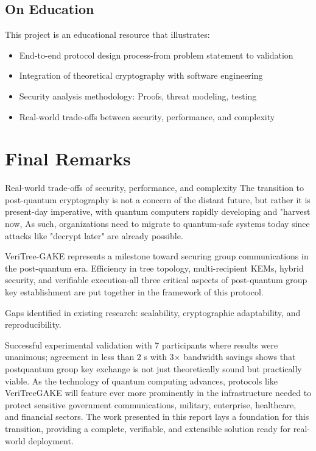 \documentclass[12pt,a4paper]{report}
\begin{document}
\subsection{On Education}

This project is an educational resource that illustrates:

\begin{itemize}
\item End-to-end protocol design process-from problem statement to validation
\item Integration of theoretical cryptography with software engineering
\item Security analysis methodology: Proofs, threat modeling, testing
\item Real-world trade-offs between security, performance, and complexity
\end{itemize}

\section{Final Remarks}

Real-world trade-offs of security, performance, and complexity The transition to post-quantum cryptography is not a concern of the distant future, but rather it is present-day imperative, with quantum computers rapidly developing and "harvest now, As such, organizations need to migrate to quantum-safe systems today since attacks like "decrypt later" are already possible. 

VeriTree-GAKE represents a milestone toward securing group communications in the post-quantum era. Efficiency in tree topology, multi-recipient KEMs, hybrid security, and verifiable execution-all three critical aspects of post-quantum group key establishment are put together in the framework of this protocol.

Gaps identified in existing research: scalability, cryptographic adaptability, and reproducibility. 

Successful experimental validation with 7 participants where results were unanimous; agreement in less than 2 s with 3× bandwidth savings shows that postquantum group key exchange is not just theoretically sound but practically viable. As the technology of quantum computing advances, protocols like VeriTreeGAKE will feature ever more prominently in the infrastructure needed to protect sensitive government communications, military, enterprise, healthcare, and financial sectors. The work presented in this report lays a foundation for this transition, providing a complete, verifiable, and extensible solution ready for real-world deployment.
\end{document}
